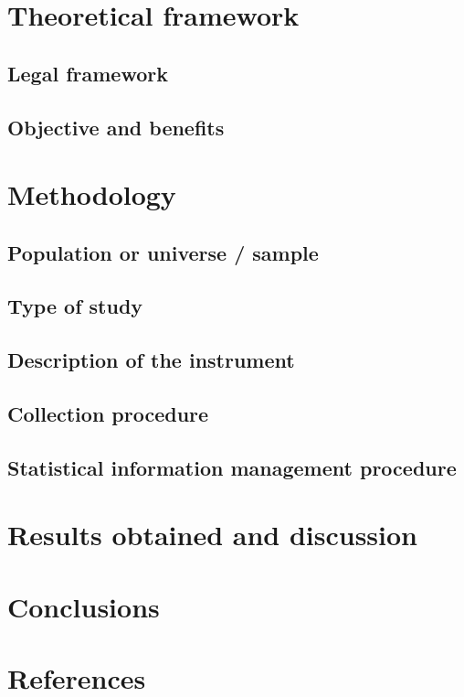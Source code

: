 \documentclass[preprint,12pt]{elsarticle}
\begin{document}
\newpage
\section{Theoretical framework}
	\subsection{Legal framework}
	\subsection{Objective and benefits}
\newpage
\section{Methodology}
	\subsection{Population or universe / sample}
	\subsection{Type of study}
	\subsection{Description of the instrument}
	\subsection{Collection procedure}
	\subsection{Statistical information management procedure}

\newpage
\section{Results obtained and discussion}

\newpage
\section{Conclusions}

\newpage
\section{References}

\end{document}
